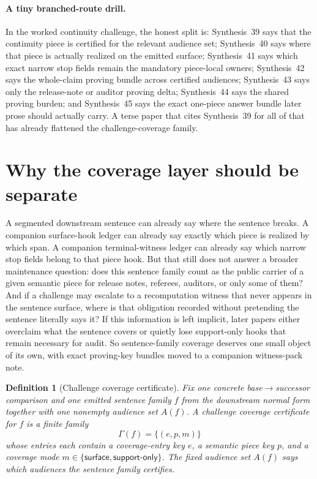 \documentclass[11pt]{article}
\newtheorem{definition}{Definition}
\begin{document}
\paragraph{A tiny branched-route drill.}
In the worked continuity challenge, the honest split is: Synthesis~39 says that the continuity piece is certified for the relevant audience set; Synthesis~40 says where that piece is actually realized on the emitted surface; Synthesis~41 says which exact narrow stop fields remain the mandatory piece-local owners; Synthesis~42 says the whole-claim proving bundle across certified audiences; Synthesis~43 says only the release-note or auditor proving delta; Synthesis~44 says the shared proving burden; and Synthesis~45 says the exact one-piece answer bundle later prose should actually carry. A terse paper that cites Synthesis~39 for all of that has already flattened the challenge-coverage family.

\section{Why the coverage layer should be separate}
A segmented downstream sentence can already say where the sentence breaks.
A companion surface-hook ledger can already say exactly which piece is realized by which span.
A companion terminal-witness ledger can already say which narrow stop fields belong to that piece hook.
But that still does not answer a broader maintenance question: does this sentence family count as the public carrier of a given semantic piece for release notes, referees, auditors, or only some of them?
And if a challenge may escalate to a recomputation witness that never appears in the sentence surface, where is that obligation recorded without pretending the sentence literally says it?
If this information is left implicit, later papers either overclaim what the sentence covers or quietly lose support-only hooks that remain necessary for audit.
So sentence-family coverage deserves one small object of its own, with exact proving-key bundles moved to a companion witness-pack note.

\begin{definition}[Challenge coverage certificate]
Fix one concrete base$\to$successor comparison and one emitted sentence family $f$ from the downstream normal form together with one nonempty audience set $A(f)$.
A \emph{challenge coverage certificate} for $f$ is a finite family
\[
\Gamma(f)=\{(e,p,m)\}
\]
whose entries each contain a coverage-entry key $e$, a semantic piece key $p$, and a coverage mode $m\in\{\textsf{surface},\textsf{support-only}\}$.
The fixed audience set $A(f)$ says which audiences the sentence family certifies.
\end{definition}
\end{document}
